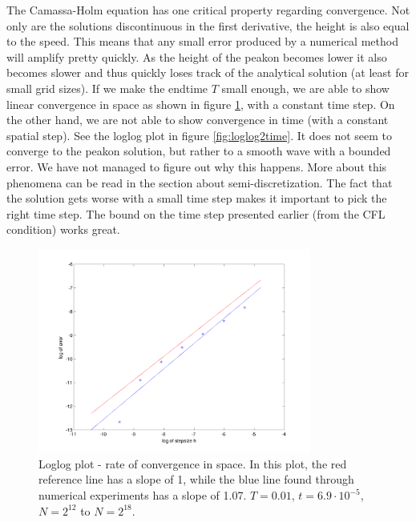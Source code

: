 The Camassa-Holm equation has one critical property regarding convergence. Not only are the solutions discontinuous in the first derivative, the height is also equal to the speed. This means that any small error produced by a numerical method will amplify pretty quickly. As the height of the peakon becomes lower it also becomes slower and thus quickly loses track of the analytical solution (at least for small grid sizes). If we make the endtime $T$ small enough, we are able to show linear convergence in space as shown in figure \ref{fig:loglog2}, with a constant time step. On the other hand, we are not able to show convergence in time (with a constant spatial step). See the loglog plot in figure \ref{fig:loglog2time}. It does not seem to converge to the peakon solution, but rather to a smooth wave with a bounded error. We have not managed to figure out why this happens. More about this phenomena can be read in the section about semi-discretization. The fact that the solution gets worse with a small time step makes it important to pick the right time step. The bound on the time step presented earlier (from the CFL condition) works great. 
 

\begin{figure}[h]
        \centering
        \includegraphics[width=0.8\textwidth]{gfx/loglog2}
        \caption{Loglog plot - rate of convergence in space. In this plot, the red reference line has a slope of 1, while the blue line found through numerical experiments has a slope of 1.07. $T = 0.01$, $t = 6.9 \cdot 10^{-5}$,$N = 2^{12}$ to $N = 2^{18}$.}
        \label{fig:loglog2}
\end{figure}


